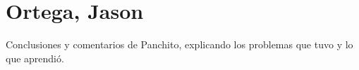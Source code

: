 \section{Ortega, Jason}
Conclusiones y comentarios de Panchito, explicando los problemas que tuvo y lo que aprendió.